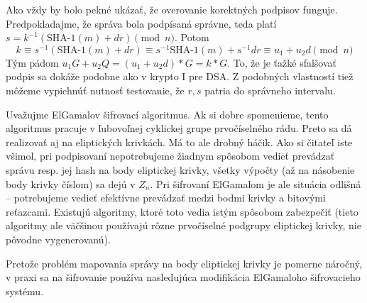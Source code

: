 Ako vždy by bolo pekné ukázať, že overovanie korektných podpisov
funguje.
Predpokladajme, že správa bola podpísaná správne, teda platí
$s = k^{-1} (\mbox{SHA-1}(m) + d r) \pmod{n}$.
Potom 
\begin{equation*}
    k \equiv s^{-1} (\mbox{SHA-1}(m) + d r)  \equiv
    s^{-1} \mbox{SHA-1}(m) + s^{-1} d r \equiv u_1 + u_2 d \pmod{n}
\end{equation*}
Tým pádom
$u_1 G + u_2 Q = (u_1 + u_2 d)*G = k*G$.
To, že je ťažké sfalšovať podpis sa dokáže podobne ako v krypto I pre
DSA. Z podobných vlastností tiež môžeme vypichnúť nutnosť testovanie,
že $r,s$ patria do správneho intervalu.

\begin{poznamka}
    Uvažujme ElGamalov šifrovací algoritmus. Ak si dobre spomenieme,
    tento algoritmus pracuje v ľubovoľnej cyklickej grupe
    prvočíselného rádu. Preto sa dá realizovať aj na eliptických
    krivkách. Má to ale drobný háčik.
    Ako si čitateľ iste všimol, pri podpisovaní nepotrebujeme
    žiadnym spôsobom vedieť prevádzať správu resp. jej hash na body
    eliptickej krivky, všetky výpočty (až na násobenie body krivky
    číslom) sa dejú v $Z_n$. Pri šifrovaní ElGamalom 
    je ale situácia odlišná -- potrebujeme vedieť efektívne prevádzať
    medzi bodmi krivky a bitovými reťazcami. Existujú algoritmy, ktoré
    toto vedia istým spôsobom zabezpečiť (tieto algoritmy ale väčšinou
    používajú rôzne prvočíselné podgrupy eliptickej krivky, nie
    pôvodne vygenerovanú).
\end{poznamka}

Pretože problém mapovania správy na body eliptickej krivky je pomerne
náročný, v praxi sa na šifrovanie používa nasledujúca modifikácia
ElGamaloho šifrovacieho systému.
